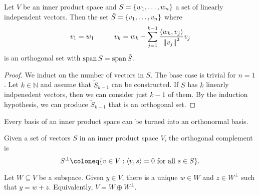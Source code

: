 \documentclass{subfiles}
\begin{document}
\begin{theorem}
    Let $V$ be an inner product space and $S = \qty{w_1, \ldots, w_n}$ a set of linearly independent vectors. Then the set $\tilde{S} = \qty{v_1, \ldots, v_n}$ where
    \begin{align*}
        v_1 = w_1 \hspace{1cm} v_k = w_k - \sum_{j=1}^{k-1} \frac{\langle w_k, v_j \rangle}{\norm{v_j}^2} v_j
    \end{align*}
    is an orthogonal set with $\operatorname{span}{S} = \operatorname{span}{\tilde{S}}$.
\end{theorem}

\begin{proof}
    We induct on the number of vectors in $S$. The base case is trivial for $n = 1$. Let $k \in \mathbb{N}$ and assume that $\tilde{S}_{k-1}$ can be constructed. If $S$ has $k$ linearly indpenedent vectors, then we can consider just $k-1$ of them. By the induction hypothesis, we can produce $\tilde{S}_{k-1}$ that is an orthogonal set. 

\end{proof}

\begin{corollary}
    Every basis of an inner product space can be turned into an orthonormal basis.
\end{corollary}

\begin{definition}
    Given a set of vectors $S$ in an inner product space $V$, the orthogonal complement is
    \[
        S^\perp \coloneq \qty{v \in V : \langle v, s \rangle = 0 \text{ for all $s \in S$}}
    .\]
\end{definition}

\begin{theorem}
    Let $W \subseteq V$ be a subspace. Given $y \in V$, there is a unique $w \in W$ and $z \in W^\perp$ such that $y = w + z$. Equivalently, $V = W \oplus W^\perp$.
\end{theorem}
\end{document}

